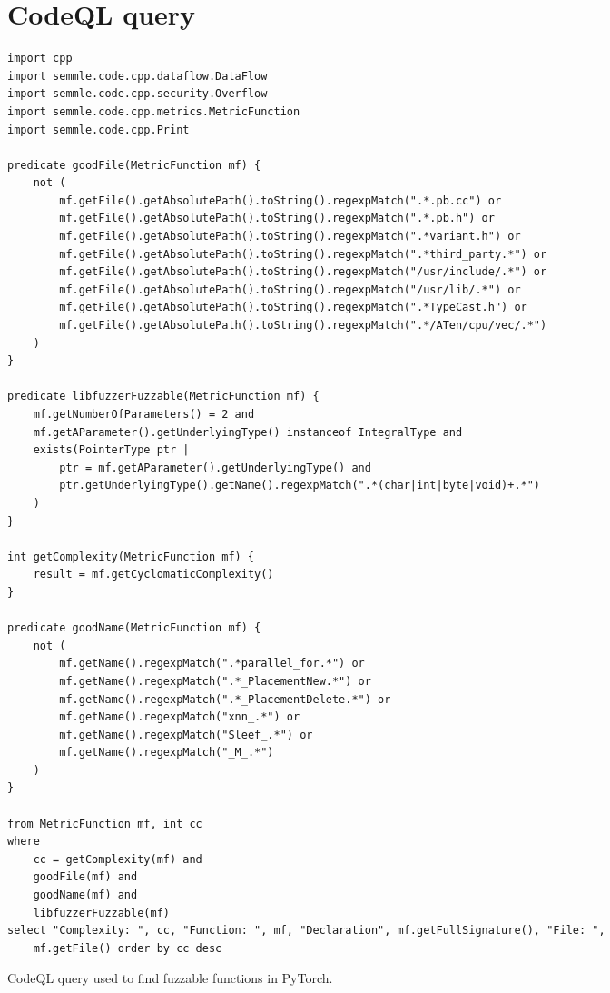 \appendix

\section{CodeQL query} \label{appendix:codeql-query}

\renewcommand\theFancyVerbLine{\footnotesize\arabic{FancyVerbLine}}

\begin{code}
    \begin{verbatim}
import cpp
import semmle.code.cpp.dataflow.DataFlow
import semmle.code.cpp.security.Overflow
import semmle.code.cpp.metrics.MetricFunction
import semmle.code.cpp.Print

predicate goodFile(MetricFunction mf) {
    not (
        mf.getFile().getAbsolutePath().toString().regexpMatch(".*.pb.cc") or
        mf.getFile().getAbsolutePath().toString().regexpMatch(".*.pb.h") or
        mf.getFile().getAbsolutePath().toString().regexpMatch(".*variant.h") or
        mf.getFile().getAbsolutePath().toString().regexpMatch(".*third_party.*") or
        mf.getFile().getAbsolutePath().toString().regexpMatch("/usr/include/.*") or
        mf.getFile().getAbsolutePath().toString().regexpMatch("/usr/lib/.*") or
        mf.getFile().getAbsolutePath().toString().regexpMatch(".*TypeCast.h") or
        mf.getFile().getAbsolutePath().toString().regexpMatch(".*/ATen/cpu/vec/.*")
    )
}

predicate libfuzzerFuzzable(MetricFunction mf) {
    mf.getNumberOfParameters() = 2 and
    mf.getAParameter().getUnderlyingType() instanceof IntegralType and
    exists(PointerType ptr |
        ptr = mf.getAParameter().getUnderlyingType() and
        ptr.getUnderlyingType().getName().regexpMatch(".*(char|int|byte|void)+.*")
    )
}

int getComplexity(MetricFunction mf) {
    result = mf.getCyclomaticComplexity()
}

predicate goodName(MetricFunction mf) {
    not (
        mf.getName().regexpMatch(".*parallel_for.*") or
        mf.getName().regexpMatch(".*_PlacementNew.*") or
        mf.getName().regexpMatch(".*_PlacementDelete.*") or
        mf.getName().regexpMatch("xnn_.*") or
        mf.getName().regexpMatch("Sleef_.*") or
        mf.getName().regexpMatch("_M_.*")
    )
}

from MetricFunction mf, int cc
where
    cc = getComplexity(mf) and
    goodFile(mf) and
    goodName(mf) and
    libfuzzerFuzzable(mf)
select "Complexity: ", cc, "Function: ", mf, "Declaration", mf.getFullSignature(), "File: ",
    mf.getFile() order by cc desc
\end{verbatim}
    \caption{CodeQL query used to find fuzzable functions in PyTorch.}
\end{code}

